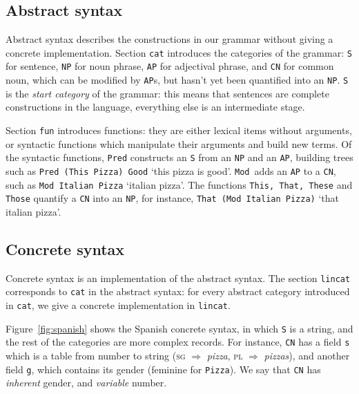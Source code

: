 \documentclass[11pt]{article}
\def\t#1{\texttt{#1}}
\begin{document}
\subsection{Abstract syntax}


Abstract syntax describes the constructions in our grammar without
giving a concrete implementation.
Section \t{cat} introduces the categories of the grammar: \t{S} for sentence,
\t{NP} for noun phrase,  \t{AP} for adjectival phrase, and \t{CN} for
common noun, which can be modified by \t{AP}s, but hasn't yet been
quantified into an \t{NP}. \t{S} is the \emph{start category} of the grammar:
this means that sentences are complete constructions in the language,
everything else is an intermediate stage.

Section \t{fun} introduces functions: they are either lexical
items without arguments, or syntactic functions which manipulate their
arguments and build new terms. Of the syntactic functions, \t{Pred}
constructs an \t{S} from an \t{NP} and an \t{AP}, building trees
such as \t{Pred (This Pizza) Good} `this pizza is good'. \t{Mod}~adds
an \t{AP} to a \t{CN}, such as \t{Mod Italian   Pizza} `italian pizza'. The functions
\t{This, That, These} and \t{Those} quantify a \t{CN} into an \t{NP},
for instance, \t{That (Mod Italian Pizza)} `that italian pizza'. 

\subsection{Concrete syntax}
Concrete syntax is an implementation of the abstract syntax.
The section \t{lincat} corresponds to \t{cat} in the abstract syntax:
for every abstract category introduced in \t{cat}, we give a concrete implementation in \t{lincat}.


Figure~\ref{fig:spanish} shows the Spanish concrete
syntax, in which \t{S} is a string, and the rest of the
categories are more complex records. For instance, \t{CN} has a field \t{s} which
is a table from number to string (\textsc{sg} $\Rightarrow$
\emph{pizza}, \textsc{pl} $\Rightarrow$ \emph{pizzas}), and another field \t{g}, which contains its gender
(feminine for \t{Pizza}). We say that \t{CN} has \emph{inherent} gender,
and \emph{variable} number.
\end{document}
